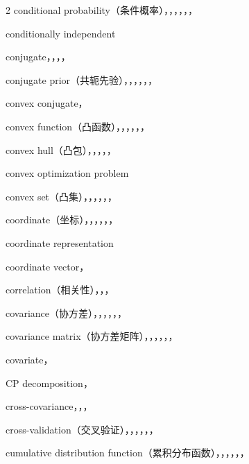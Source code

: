 \begin{multicols}{2}
\noindent conditional probability（条件概率），，，，，，\par
\noindent conditionally independent\par
\noindent conjugate，，，，\par
\noindent conjugate prior（共轭先验），，，，，，\par
\noindent convex conjugate，\par
\noindent convex function（凸函数），，，，，，\par
\noindent convex hull（凸包），，，，，\par
\noindent convex optimization problem\par
\noindent convex set（凸集），，，，，，\par
\noindent coordinate（坐标），，，，，，\par
\noindent coordinate representation\par
\noindent coordinate vector，\par
\noindent correlation（相关性），，，\par
\noindent covariance（协方差），，，，，，\par
\noindent covariance matrix（协方差矩阵），，，，，，\par
\noindent covariate，\par
\noindent CP decomposition，\par
\noindent cross-covariance，，，\par
\noindent cross-validation（交叉验证），，，，，，\par
\noindent cumulative distribution function（累积分布函数），，，，，，\par


\end{multicols}
